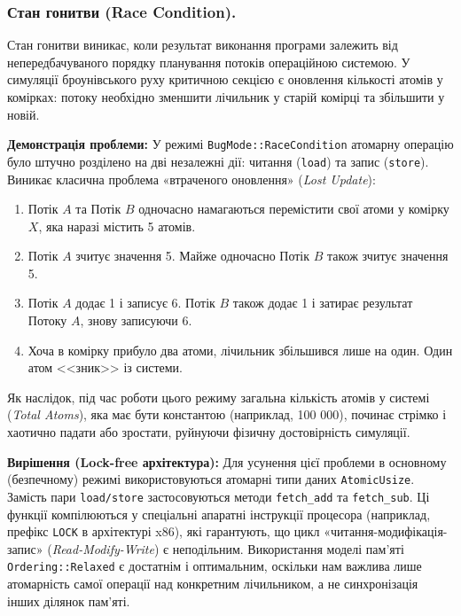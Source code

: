 \documentclass[14pt, a4paper]{extreport}
\begin{document}
	\subsubsection{Стан гонитви (Race Condition).}
	
	Стан гонитви виникає, коли результат виконання програми залежить від непередбачуваного порядку планування потоків операційною системою. У симуляції броунівського руху критичною секцією є оновлення кількості атомів у комірках: потоку необхідно зменшити лічильник у старій комірці та збільшити у новій.
	
	\textbf{Демонстрація проблеми:} 
	У режимі \texttt{BugMode::RaceCondition} атомарну операцію було штучно розділено на дві незалежні дії: читання (\texttt{load}) та запис (\texttt{store}). 
	Виникає класична проблема «втраченого оновлення» (\textit{Lost Update}):
	\begin{enumerate}
		\item Потік $A$ та Потік $B$ одночасно намагаються перемістити свої атоми у комірку $X$, яка наразі містить 5 атомів.
		\item Потік $A$ зчитує значення 5. Майже одночасно Потік $B$ також зчитує значення 5.
		\item Потік $A$ додає 1 і записує 6. Потік $B$ також додає 1 і затирає результат Потоку $A$, знову записуючи 6.
		\item Хоча в комірку прибуло два атоми, лічильник збільшився лише на один. Один атом <<зник>> із системи.
	\end{enumerate}
	
	Як наслідок, під час роботи цього режиму загальна кількість атомів у системі (\textit{Total Atoms}), яка має бути константою (наприклад, 100 000), починає стрімко і хаотично падати або зростати, руйнуючи фізичну достовірність симуляції.
	
	\textbf{Вирішення (Lock-free архітектура):}
	Для усунення цієї проблеми в основному (безпечному) режимі використовуються атомарні типи даних \texttt{AtomicUsize}. Замість пари \texttt{load/store} застосовуються методи \texttt{fetch\_add} та \texttt{fetch\_sub}. 
	Ці функції компілюються у спеціальні апаратні інструкції процесора (наприклад, префікс \texttt{LOCK} в архітектурі x86), які гарантують, що цикл «читання-модифікація-запис» (\textit{Read-Modify-Write}) є неподільним. Використання моделі пам'яті \texttt{Ordering::Relaxed} є достатнім і оптимальним, оскільки нам важлива лише атомарність самої операції над конкретним лічильником, а не синхронізація інших ділянок пам'яті.
	
\end{document}
